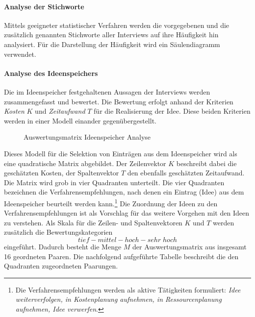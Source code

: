 \documentclass[../../main.tex]{subfiles}
\begin{document}
\paragraph*{Analyse der Stichworte}\mbox{}


\begin{sloppypar}
Mittels geeigneter statistischer Verfahren werden die vorgegebenen und die zusätzlich genannten Stichworte aller Interviews auf ihre Häufigkeit hin analysiert. Für die Darstellung der Häufigkeit wird ein Säulendiagramm verwendet.
\end{sloppypar}

\paragraph*{Analyse des Ideenspeichers}\mbox{}

\begin{sloppypar}
Die im Ideenspeicher festgehaltenen Aussagen der Interviews werden zusammengefasst und bewertet. Die Bewertung erfolgt anhand der Kriterien \textit{Kosten} $K$ und \textit{Zeitaufwand} $T$ für die Realisierung der Idee. Diese beiden Kriterien werden in einer Modell einander gegenübergestellt.
\end{sloppypar}

\begin{figure}[H]
 \centering
    
 \caption{Auswertungsmatrix Ideenspeicher Analyse}
 \label{Auswertungsmatrix Ideenspeicher-Analyse}
\end{figure}

\begin{sloppypar}
Dieses Modell für die Selektion von Einträgen aus dem Ideenspeicher wird als eine quadratische Matrix abgebildet. Der Zeilenvektor $K$ beschreibt dabei die geschätzten Kosten, der Spaltenvektor $T$ den ebenfalls geschätzten Zeitaufwand. Die Matrix wird grob in vier Quadranten unterteilt. Die vier Quadranten bezeichnen die Verfahrensempfehlungen, nach denen ein Eintrag (Idee) aus dem Ideenspeicher beurteilt werden kann.\footnote{Die Verfahrensempfehlungen werden als aktive Tätigkeiten formuliert: \textit{Idee weiterverfolgen, in Kostenplanung aufnehmen, in Ressourcenplanung aufnehmen, Idee verwerfen}.} Die Zuordnung der Ideen zu den Verfahrensempfehlungen ist als Vorschlag für das weitere Vorgehen mit den Ideen zu verstehen. Als Skala für die Zeilen- und Spaltenvektoren $K$ und $T$ werden zusätzlich die Bewertungskategorien 
\[tief - mittel - hoch - sehr \; hoch\]
eingeführt. Dadurch besteht die Menge $M$ der Auswertungsmatrix aus insgesamt 16 geordneten Paaren. Die nachfolgend aufgeführte Tabelle beschreibt die den Quadranten zugeordneten Paarungen.
\end{sloppypar}
\end{document}
